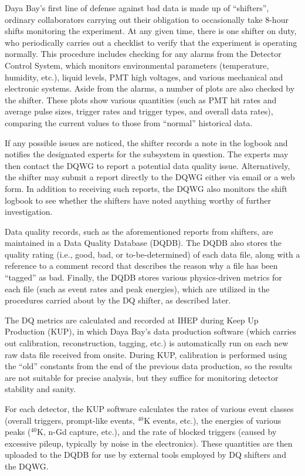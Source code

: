 \documentclass[../thesis.tex]{subfiles}
\begin{document}
Daya Bay's first line of defense against bad data is made up of ``shifters'',
ordinary collaborators carrying out their obligation to occasionally take 8-hour
shifts monitoring the experiment. At any given time, there is one shifter on
duty, who periodically carries out a checklist to verify that the experiment is
operating normally. This procedure includes checking for any alarms from the
Detector Control System, which monitors environmental parameters (temperature,
humidity, etc.), liquid levels, PMT high voltages, and various mechanical and
electronic systems. Aside from the alarms, a number of plots are also checked by
the shifter. These plots show various quantities (such as PMT hit rates and
average pulse sizes, trigger rates and trigger types, and overall data rates),
comparing the current values to those from ``normal'' historical data.

If any possible issues are noticed, the shifter records a note in the logbook
and notifies the designated experts for the subsystem in question. The experts
may then contact the DQWG to report a potential data quality
issue. Alternatively, the shifter may submit a report directly to the DQWG
either via email or a web form. In addition to receiving such reports, the DQWG
also monitors the shift logbook to see whether the shifters have noted anything
worthy of further investigation.

Data quality records, such as the aforementioned reports from shifters, are
maintained in a Data Quality Database (DQDB). The DQDB also stores the quality
rating (i.e., good, bad, or to-be-determined) of each data file, along with a
reference to a comment record that describes the reason why a file has been
``tagged'' as bad. Finally, the DQDB stores various physics-driven metrics for
each file (such as event rates and peak energies), which are utilized in the
procedures carried about by the DQ shifter, as described later.

The DQ metrics are calculated and recorded at IHEP during Keep Up Production
(KUP), in which Daya Bay's data production software (which carries out
calibration, reconstruction, tagging, etc.) is automatically run on each new raw
data file received from onsite. During KUP, calibration is performed using the
``old'' constants from the end of the previous data production, so the results
are not suitable for precise analysis, but they suffice for monitoring detector
stability and sanity.

For each detector, the KUP software calculates the rates of various event
classes (overall triggers, prompt-like events, $^{40}$K events, etc.), the
energies of various peaks ($^{40}$K, n-Gd capture, etc.), and the rate of
blocked triggers (caused by excessive pileup, typically by noise in the
electronics). These quantities are then uploaded to the DQDB for use by external
tools employed by DQ shifters and the DQWG.
\end{document}
